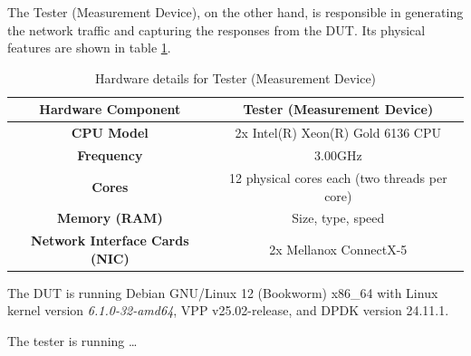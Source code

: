 The Tester (Measurement Device), on the other hand, is responsible in generating the network traffic and capturing the responses from the DUT.
Its physical features are shown in table \ref{tab:hardware_tester}. 

\begin{table}[h!]
\centering
\begin{tabular}{|c|c|}
\hline
\textbf{Hardware Component} & \textbf{Tester (Measurement Device)} \\
\hline
\textbf{CPU Model} & 2x Intel(R) Xeon(R) Gold 6136 CPU \\
\hline
\textbf{Frequency} & 3.00GHz \\
\hline
\textbf{Cores} & 12 physical cores each (two threads per core)\\
\hline
\textbf{Memory (RAM)} & Size, type, speed \\
\hline
\textbf{Network Interface Cards (NIC)} & 2x Mellanox ConnectX-5 \\
\hline
\end{tabular}
\caption{Hardware details for Tester (Measurement Device)}
\label{tab:hardware_tester}
\end{table}

The DUT is running Debian GNU/Linux 12 (Bookworm) x86\_64 with Linux kernel version \textit{6.1.0-32-amd64}, VPP v25.02-release, and DPDK version 24.11.1.

The tester is running \dots{}
